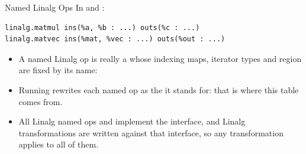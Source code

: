 \documentclass[aspectratio=169,10pt]{beamer}
\begin{document}
\begin{frame}[fragile]{Named Linalg Ops}
  In  and :
\begin{lstlisting}[language=mlir]
linalg.matmul ins(%a, %b : ...) outs(%c : ...)
linalg.matvec ins(%mat, %vec : ...) outs(%out : ...)
\end{lstlisting}
  \vspace{0.2em}
  \begin{itemize}
    \item<2-> A \alert{named} Linalg op is really a  whose
      indexing maps, iterator types and region are fixed by its name:
  \end{itemize}
  \vspace{0.2em}
  \vspace{0.2em}
  \begin{itemize}
    \item<3-> Running  rewrites each named op
      as the  it stands for: that is where this table
      comes from.
    \item<4-> All Linalg named ops and  implement the
      \alert{ interface}, and Linalg transformations are written
      against that interface, so any transformation applies to all of them.
  \end{itemize}
\end{frame}
\end{document}
